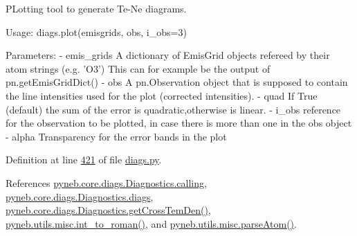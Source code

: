 \begin{DoxyVerb}PLotting tool to generate Te-Ne diagrams.

Usage:
    diags.plot(emisgrids, obs, i_obs=3)
    
Parameters:
    - emis_grids    A dictionary of EmisGrid objects refereed by their atom strings (e.g. 'O3')
            This can for example be the output of pn.getEmisGridDict()
    - obs           A pn.Observation object that is supposed to contain the line intensities
            used for the plot (corrected intensities).
    - quad          If True (default) the sum of the error is quadratic,otherwise is linear.
    - i_obs         reference for the observation to be plotted, in case there is more than one
            in the obs object
    - alpha         Transparency for the error bands in the plot\end{DoxyVerb}
 

Definition at line \hyperlink{diags_8py_source_l00421}{421} of file \hyperlink{diags_8py_source}{diags.\-py}.



References \hyperlink{diags_8py_source_l00169}{pyneb.\-core.\-diags.\-Diagnostics.\-calling}, \hyperlink{diags_8py_source_l00173}{pyneb.\-core.\-diags.\-Diagnostics.\-diags}, \hyperlink{diags_8py_source_l00554}{pyneb.\-core.\-diags.\-Diagnostics.\-get\-Cross\-Tem\-Den()}, \hyperlink{misc_8py_source_l00055}{pyneb.\-utils.\-misc.\-int\-\_\-to\-\_\-roman()}, and \hyperlink{misc_8py_source_l00159}{pyneb.\-utils.\-misc.\-parse\-Atom()}.


